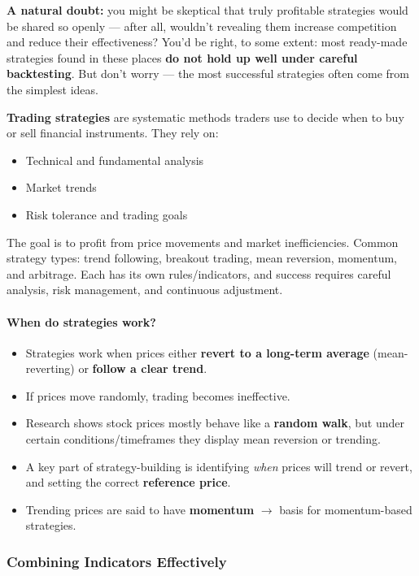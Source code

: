 \documentclass[12pt,openany]{book}
\begin{document}
\textbf{A natural doubt:} you might be skeptical that truly profitable strategies would be shared so openly --- after all, wouldn't revealing them increase competition and reduce their effectiveness? You'd be right, to some extent: most ready-made strategies found in these places \textbf{do not hold up well under careful backtesting}. But don't worry --- the most successful strategies often come from the simplest ideas.

\textbf{Trading strategies} are systematic methods traders use to decide when to buy or sell financial instruments. They rely on:
\begin{itemize}[leftmargin=*]
    \item Technical and fundamental analysis
    \item Market trends
    \item Risk tolerance and trading goals
\end{itemize}

The goal is to profit from price movements and market inefficiencies. Common strategy types: trend following, breakout trading, mean reversion, momentum, and arbitrage. Each has its own rules/indicators, and success requires careful analysis, risk management, and continuous adjustment.

\paragraph{When do strategies work?}
\begin{itemize}[leftmargin=*]
    \item Strategies work when prices either \textbf{revert to a long-term average} (mean-reverting) or \textbf{follow a clear trend}.
    \item If prices move randomly, trading becomes ineffective.
    \item Research shows stock prices mostly behave like a \textbf{random walk}, but under certain conditions/timeframes they display mean reversion or trending.
    \item A key part of strategy-building is identifying \emph{when} prices will trend or revert, and setting the correct \textbf{reference price}.
    \item Trending prices are said to have \textbf{momentum} \(\rightarrow\) basis for momentum-based strategies.
\end{itemize}

\subsubsection{Combining Indicators Effectively}
\end{document}
